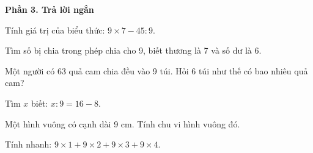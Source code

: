 \textbf{Phần 3. Trả lời ngắn}

\begin{ex} %
Tính giá trị của biểu thức: $9 \times 7 - 45 : 9$.
\end{ex}

\begin{ex} %
Tìm số bị chia trong phép chia cho 9, biết thương là 7 và số dư là 6.
\end{ex}

\begin{ex} %
Một người có 63 quả cam chia đều vào 9 túi. Hỏi 6 túi như thế có bao nhiêu quả cam?
\end{ex}

\begin{ex} %
Tìm $x$ biết: $x : 9 = 16 - 8$.
\end{ex}

\begin{ex} %
Một hình vuông có cạnh dài 9 cm. Tính chu vi hình vuông đó.
\end{ex}

\begin{ex} %
Tính nhanh: $9 \times 1 + 9 \times 2 + 9 \times 3 + 9 \times 4$.
\end{ex}
